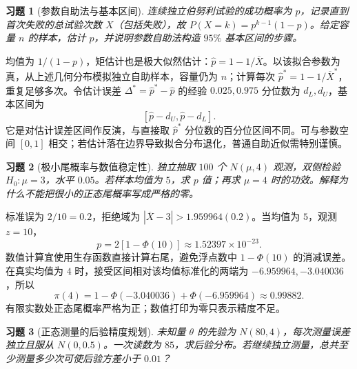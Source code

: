 \documentclass[UTF8,12pt,a4paper,fontset=fandol]{ctexart}
\newtheorem{exercise}{习题}[section]
\begin{document}
\begin{exercise}[参数自助法与基本区间]\label{q:M-PF-29}
连续独立伯努利试验的成功概率为 $p$，记录直到首次失败的总试验次数 $X$（包括失败），故 $P(X=k)=p^{k-1}(1-p)$。给定容量 $n$ 的样本，估计 $p$，并说明参数自助法构造 $95\%$ 基本区间的步骤。\par{}
\end{exercise}

\begin{solve}\label{a:M-PF-29}均值为 $1/(1-p)$，矩估计也是极大似然估计：$\widehat p=1-1/\overline X$。以该拟合参数为真，从上述几何分布模拟独立自助样本，容量仍为 $n$；计算每次 $\widehat p^*=1-1/\overline X^*$，重复足够多次。令估计误差 $\Delta^*=\widehat p^*-\widehat p$ 的经验 $0.025,0.975$ 分位数为 $d_L,d_U$，基本区间为\[[\widehat p-d_U,\widehat p-d_L].\]它是对估计误差区间作反演，与直接取 $\widehat p^*$ 分位数的百分位区间不同。可与参数空间 $[0,1]$ 相交；若估计落在边界导致拟合分布退化，普通自助近似需特别谨慎。\end{solve}

\begin{exercise}[极小尾概率与数值稳定性]\label{q:M-PF-30}
独立抽取 $100$ 个 $N(\mu,4)$ 观测，双侧检验 $H_0:\mu=3$，水平 $0.05$。若样本均值为 $5$，求 $p$ 值；再求 $\mu=4$ 时的功效。解释为什么不能把很小的正态尾概率写成严格的零。\par{}
\end{exercise}

\begin{solve}\label{a:M-PF-30}标准误为 $2/10=0.2$，拒绝域为 $|\overline X-3|>1.959964(0.2)$。当均值为 $5$，观测 $z=10$，\[p=2[1-\Phi(10)]\approx1.52397\times10^{-23}.\]数值计算宜使用生存函数直接计算右尾，避免浮点数中 $1-\Phi(10)$ 的消减误差。在真实均值为 $4$ 时，接受区间相对该均值标准化的两端为 $-6.959964,-3.040036$，所以\[\pi(4)=1-\Phi(-3.040036)+\Phi(-6.959964)\approx0.99882.\]有限实数处正态尾概率严格为正；数值打印为零只表示精度不足。\end{solve}

\begin{exercise}[正态测量的后验精度规划]\label{q:M-PF-31}
未知量 $\theta$ 的先验为 $N(80,4)$，每次测量误差独立且服从 $N(0,0.5)$。一次读数为 $85$，求后验分布。若继续独立测量，总共至少测量多少次可使后验方差小于 $0.01$？\par{}
\end{exercise}
\end{document}
